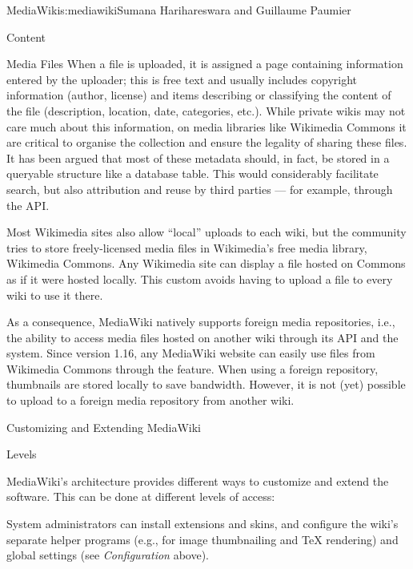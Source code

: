 \begin{aosachapter}{MediaWiki}{s:mediawiki}{Sumana Harihareswara and Guillaume Paumier}
\begin{aosasect1}{Content}
\begin{aosasect2}{Media Files}
When a file is uploaded, it is assigned a  page containing
information entered by the uploader; this is free text and usually
includes copyright information (author, license) and items describing
or classifying the content of the file (description, location, date,
categories, etc.). While private wikis may not care much about this
information, on media libraries like Wikimedia Commons it are
critical to organise the collection and ensure the legality of sharing
these files. It has been argued that most of these metadata should, in
fact, be stored in a queryable structure like a database table. This
would considerably facilitate search, but also attribution and reuse
by third parties --- for example, through the API.

Most Wikimedia sites also allow ``local'' uploads to each wiki, but the
community tries to store freely-licensed media files in Wikimedia's
free media library, Wikimedia Commons. Any Wikimedia site can display
a file hosted on Commons as if it were hosted locally. This custom
avoids having to upload a file to every wiki to use it there.

As a consequence, MediaWiki natively supports foreign media
repositories, i.e., the ability to access media files hosted on
another wiki through its API and the 
system. Since version 1.16, any MediaWiki website can easily use files
from Wikimedia Commons through the  feature. When
using a foreign repository, thumbnails are stored locally to save
bandwidth. However, it is not (yet) possible to upload to a foreign
media repository from another wiki.

\end{aosasect2}

\end{aosasect1}

\begin{aosasect1}{Customizing and Extending MediaWiki}

\begin{aosasect2}{Levels}

MediaWiki's architecture provides different ways to customize and
extend the software. This can be done at different levels of access:

\begin{aosaitemize}

\item System administrators can install extensions and skins, and
  configure the wiki's separate helper programs (e.g., for image
  thumbnailing and TeX rendering) and global settings (see
  \emph{Configuration} above).


\end{aosaitemize}
\end{aosasect2}
\end{aosasect1}
\end{aosachapter}
